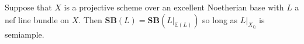 \documentclass[a4paper,12pt]{book}
\newcommand{\SB}{\mathbf{SB}}
\begin{document}
	\begin{theorem}
		Suppose that $X$ is a projective scheme over an excellent Noetherian base with $L$ a nef line bundle on $X$. Then $\SB(L)=\SB(L|_{\mathbb{E}(L)})$ so long as $L|_{X_{\mathbb{Q}}}$ is semiample.
	\end{theorem} 
	
	
	
	
	
	
	
	
\end{document}
